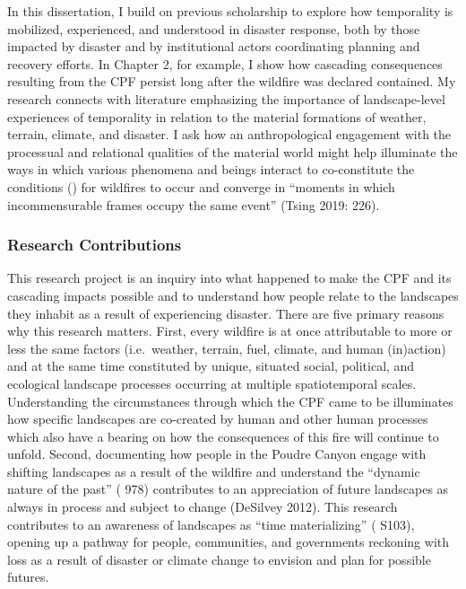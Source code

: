 \documentclass[
]{article}
\begin{document}
In this dissertation, I build on previous scholarship to explore how temporality is mobilized, experienced, and understood in disaster response, both by those impacted by disaster and by institutional actors coordinating planning and recovery efforts. In Chapter 2, for example, I show how cascading consequences resulting from the CPF persist long after the wildfire was declared contained. My research connects with literature emphasizing the importance of landscape-level experiences of temporality in relation to the material formations of weather, terrain, climate, and disaster. I ask how an anthropological engagement with the processual and relational qualities of the material world might help illuminate the ways in which various phenomena and beings interact to co-constitute the conditions () for wildfires to occur and converge in ``moments in which incommensurable frames occupy the same event'' (Tsing 2019: 226).

\subsubsection{Research Contributions}\label{research-contributions}

This research project is an inquiry into what happened to make the CPF and its cascading impacts possible and to understand how people relate to the landscapes they inhabit as a result of experiencing disaster. There are five primary reasons why this research matters. First, every wildfire is at once attributable to more or less the same factors (i.e.~weather, terrain, fuel, climate, and human (in)action) and at the same time constituted by unique, situated social, political, and ecological landscape processes occurring at multiple spatiotemporal scales. Understanding the circumstances through which the CPF came to be illuminates how specific landscapes are co-created by human and other human processes which also have a bearing on how the consequences of this fire will continue to unfold. Second, documenting how people in the Poudre Canyon engage with shifting landscapes as a result of the wildfire and understand the ``dynamic nature of the past'' ( 978) contributes to an appreciation of future landscapes as always in process and subject to change (DeSilvey 2012). This research contributes to an awareness of landscapes as ``time materializing'' ( S103), opening up a pathway for people, communities, and governments reckoning with loss as a result of disaster or climate change to envision and plan for possible futures.
\end{document}
